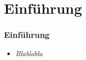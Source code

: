 \section{Einführung}

\begin{frame}
	\frametitle{Einführung}
	\begin{itemize}
		\item  \textit{Blablabla}
	\end{itemize}
\end{frame}